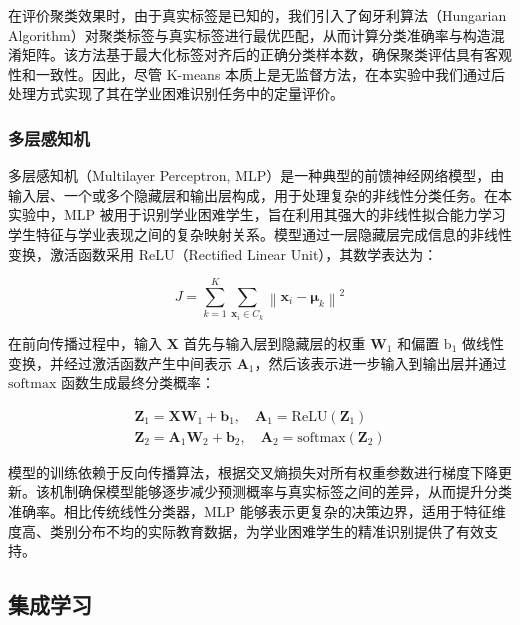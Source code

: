 \documentclass[a4paper, utf8]{ctexart}
\begin{document}
	在评价聚类效果时，由于真实标签是已知的，我们引入了匈牙利算法（Hungarian Algorithm）对聚类标签与真实标签进行最优匹配，从而计算分类准确率与构造混淆矩阵。该方法基于最大化标签对齐后的正确分类样本数，确保聚类评估具有客观性和一致性。因此，尽管 K-means 本质上是无监督方法，在本实验中我们通过后处理方式实现了其在学业困难识别任务中的定量评价。
	
	\subsubsection{多层感知机}
	
	多层感知机（Multilayer Perceptron, MLP）是一种典型的前馈神经网络模型，由输入层、一个或多个隐藏层和输出层构成，用于处理复杂的非线性分类任务。在本实验中，MLP 被用于识别学业困难学生，旨在利用其强大的非线性拟合能力学习学生特征与学业表现之间的复杂映射关系\cite{ref4,ref11,ref22}。模型通过一层隐藏层完成信息的非线性变换，激活函数采用 ReLU（Rectified Linear Unit），其数学表达为：
	
	\vspace{-.5em}
	\begin{equation}
		J=\sum^{K}_{k=1}\sum_{\mathbf{x}_i\in C_k}\left\| \mathbf{x}_i - \mathbf{\mu}_k \right\|^2
	\end{equation}
	
	在前向传播过程中，输入 $\mathbf{X}$ 首先与输入层到隐藏层的权重 $\mathbf{W}_1$ 和偏置 $\text{b}_1$ 做线性变换，并经过激活函数产生中间表示 $\mathbf{A}_1$，然后该表示进一步输入到输出层并通过 $\text{softmax}$ 函数生成最终分类概率：
	
	\vspace{-1em}
	\begin{gather}
		\mathbf{Z}_1 = \mathbf{X}\mathbf{W}_1 + \mathbf{b}_1, \quad \mathbf{A}_1=\text{ReLU}(\mathbf{Z}_1) \\
		\mathbf{Z}_2 = \mathbf{A}_1\mathbf{W}_2 + \mathbf{b}_2, \quad \mathbf{A}_2=\text{softmax}(\mathbf{Z}_2)
	\end{gather}
	
	模型的训练依赖于反向传播算法，根据交叉熵损失对所有权重参数进行梯度下降更新。该机制确保模型能够逐步减少预测概率与真实标签之间的差异，从而提升分类准确率。相比传统线性分类器，MLP 能够表示更复杂的决策边界，适用于特征维度高、类别分布不均的实际教育数据，为学业困难学生的精准识别提供了有效支持。
	
	
	\subsection{集成学习}
	
\end{document}
